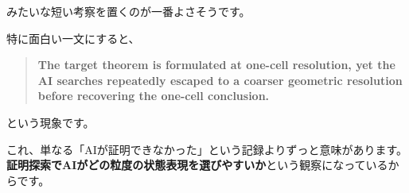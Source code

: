\documentclass[11pt,a4paper]{article}
\begin{document}
\begin{quote}
\end{quote}

みたいな短い考察を置くのが一番よさそうです。

特に面白い一文にすると、

\begin{quote}
\textbf{The target theorem is formulated at one-cell resolution, yet the AI searches repeatedly escaped to a coarser geometric resolution before recovering the one-cell conclusion.}
\end{quote}

という現象です。

これ、単なる「AIが証明できなかった」という記録よりずっと意味があります。\textbf{証明探索でAIがどの粒度の状態表現を選びやすいか}という観察になっているからです。
\end{document}
